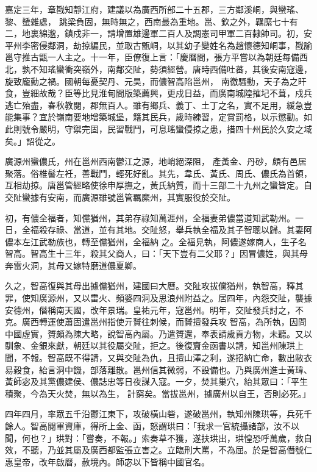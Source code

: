\begin{pinyinscope}
 嘉定三年，章戡知靜江府，建議以為廣西所部二十五郡，三方鄰溪峒，與蠻瑤、黎、蜑雜處，
 跳梁負固，無時無之，西南最為重地。邕、欽之外，羈縻七十有二，地裏綿邈，鎮戍非一，請增置雄邊軍二百人及調憲司甲軍二百隸帥司。初，安平州李密侵鄰洞，劫掠編民，並取古甑峒，以其幼子變姓名為趙懷德知峒事，戡諭邕守推古甑一人主之。十一年，臣僚復上言：「慶曆間，張方平嘗以為朝廷每備西北，孰不知瑤蠻衝突嶺外，南鄰交阯，勢須經營。唐時西備吐蕃，其後安南寇邊，旋致龐勳之禍。國朝每憂契丹、元昊，而儂智高陷邕州，
 南徼騷動，天子為之旰食，豈細故哉？臣等比見淮甸間版築薦興，更戍日益，而廣南城隍摧圮不葺，戍兵逃亡殆盡，春秋教閱，郡無百人。雖有鄉兵、義丁、土丁之名，實不足用，緩急豈能集事？宜於嶺南要地增築城堡，籍其民兵，歲時練習，定賞罰格，以示懲勸。如此則號令嚴明，守禦完固，民習戰鬥，可息瑤蠻侵掠之患，措四十州民於久安之域矣。」詔從之。



 廣源州蠻儂氏，州在邕州西南鬱江之源，地峭絕深阻，
 產黃金、丹砂，頗有邑居聚落。俗椎髻左衽，善戰鬥，輕死好亂。其先，韋氏、黃氏、周氏、儂氏為首領，互相劫掠。唐邕管經略使徐申厚撫之，黃氏納質，而十三部二十九州之蠻皆定。自交阯蠻據有安南，而廣源雖號邕管羈縻州，其實服役於交阯。



 初，有儂全福者，知儻猶州，其弟存祿知萬涯州，全福妻弟儂當道知武勒州。一日，全福殺存祿、當道，並有其地。交阯怒，舉兵執全福及其子智聰以歸。其妻阿儂本左江武勒族也，轉至儻猶州，全福納
 之。全福見執，阿儂遂嫁商人，生子名智高。智高生十三年，殺其父商人，曰：「天下豈有二父耶？」因冒儂姓，與其母奔雷火洞，其母又嫁特磨道儂夏卿。



 久之，智高復與其母出據儻猶州，建國曰大曆。交阯攻拔儻猶州，執智高，釋其罪，使知廣源州，又以雷火、頻婆四洞及思浪州附益之。居四年，內怨交阯，襲據安德州，僭稱南天國，改年景瑞。皇祐元年，寇邕州。明年，交阯發兵討之，不克。廣西轉運使蕭固遣邕州指使亓贇往刺候，而贇擅發兵攻
 智高，為所執，因問中國虛實，贇頗為陳大略，說智高內屬。乃遣贇還，奉表請歲貢方物，未聽。又以馴象、金銀來獻，朝廷以其役屬交阯，拒之。後復齎金函書以請，知邕州陳珙上聞，不報。智高既不得請，又與交阯為仇，且擅山澤之利，遂招納亡命，數出敝衣易穀食，紿言洞中饑，部落離散。邕州信其微弱，不設備也。乃與廣州進士黃瑋、黃師宓及其黨儂建侯、儂誌忠等日夜謀入寇。一夕，焚其巢穴，紿其眾曰：「平生積聚，今為天火焚，無以為生，
 計窮矣。當拔邕州，據廣州以自王，否則必死。」



 四年四月，率眾五千沿鬱江東下，攻破橫山砦，遂破邕州，執知州陳珙等，兵死千餘人。智高閱軍資庫，得所上金、函，怒謂珙曰：「我求一官統攝諸部，汝不以聞，何也？」珙對：「嘗奏，不報。」索奏草不獲，遂扶珙出，珙惶恐呼萬歲，救自效，不聽，乃並其屬及廣西都監張立害之。立臨刑大罵，不為屈。於是智高僭號仁惠皇帝，改年啟曆，赦境內。師宓以下皆稱中國官名。




\end{pinyinscope}
